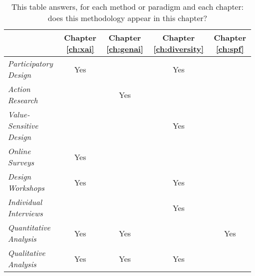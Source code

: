 \begin{table}[htbp]
    \centering
    \begin{tabular}{|l|c|c|c|c|}
    \hline
    & \textbf{Chapter \ref{ch:xai}} & \textbf{Chapter \ref{ch:genai}} & \textbf{Chapter \ref{ch:diversity}} & \textbf{Chapter \ref{ch:spf}} \\
    \hline
    \textit{Participatory Design} & Yes & & Yes & \\ 
    \textit{Action Research} & & Yes & & \\ 
    \textit{Value-Sensitive Design} & & & Yes & \\ 
    \hline
    \textit{Online Surveys} & Yes & & & \\ 
    \textit{Design Workshops} & Yes & & Yes & \\ 
    \textit{Individual Interviews} & & & Yes & \\ 
    \textit{Quantitative Analysis} & Yes & Yes & & Yes \\ 
    \textit{Qualitative Analysis} & Yes & Yes & Yes & \\
    \hline
    \end{tabular}
    \caption{This table answers, for each method or paradigm and each chapter: does this methodology appear in this chapter?}
    \label{tab:method_subsections}
\end{table}
